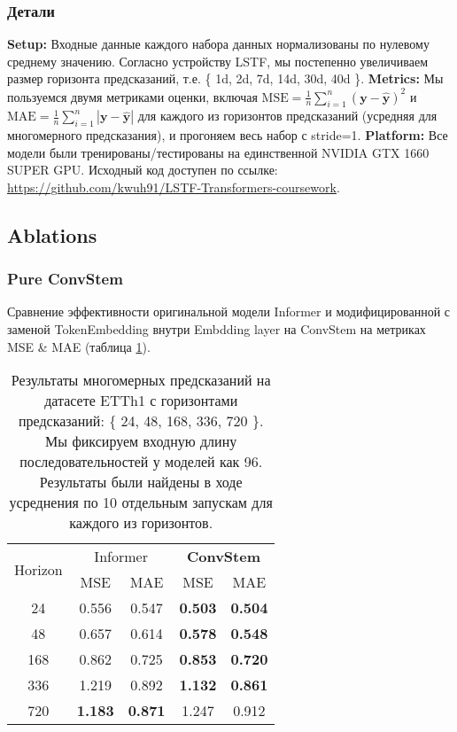 
\subsubsection{Детали}

\textbf{Setup:} Входные данные каждого набора данных нормализованы по нулевому среднему значению. 
Согласно устройству LSTF, мы постепенно увеличиваем размер горизонта предсказаний, 
т.е. \{ 1d, 2d, 7d, 14d, 30d, 40d \}.
\textbf{Metrics:} Мы пользуемся двумя метриками оценки, включая 
$\text{MSE}=\frac{1}{n} \sum_{i=1}^n (\bm{y} - \hat{\bm{y}})^2$ 
и $\text{MAE}=\frac{1}{n} \sum_{i=1}^n |\bm{y} - \hat{\bm{y}}|$ 
для каждого из горизонтов предсказаний (усредняя для многомерного 
предсказания), и прогоняем весь набор с stride=1.
\textbf{Platform:}
Все модели были тренированы/тестированы на единственной 
NVIDIA GTX 1660 SUPER GPU. Исходный код доступен 
по ссылке: \url{https://github.com/kwuh91/LSTF-Transformers-coursework}.

\subsection{Ablations}

\subsubsection{Pure ConvStem}

Сравнение эффективности оригинальной модели Informer и модифицированной
с заменой TokenEmbedding внутри Embdding layer на ConvStem 
на метриках MSE \& MAE (таблица \ref{tab:etth1-convstem}).

\begin{table}[!ht]
    \centering
    \begin{tabular}{c  cc  cc}
    \toprule
    \multirow{2}{*}{{Horizon}} 
      & \multicolumn{2}{c}{{Informer}} 
      & \multicolumn{2}{c}{\textbf{ConvStem}} \\
    \cmidrule(lr){2-3} \cmidrule(lr){4-5}
      & {MSE} & {MAE} 
      & {MSE} & {MAE} \\
    \midrule
    24   & 0.556 & 0.547 & \textbf{0.503} & \textbf{0.504} \\
    48   & 0.657 & 0.614 & \textbf{0.578} & \textbf{0.548} \\
    168  & 0.862 & 0.725 & \textbf{0.853} & \textbf{0.720} \\
    336  & 1.219 & 0.892 & \textbf{1.132} & \textbf{0.861} \\
    720  & \textbf{1.183} & \textbf{0.871} & 1.247 & 0.912 \\
    \bottomrule
    \end{tabular}
    \caption{Результаты многомерных предсказаний на датасете ETTh1 с 
    горизонтами предсказаний: \{ 24, 48, 168, 336, 720 \}. 
    Мы фиксируем входную длину последовательностей у моделей как 96.
    Результаты были найдены в ходе усреднения по 10 отдельным запускам 
    для каждого из горизонтов.}
    \label{tab:etth1-convstem}
\end{table}

